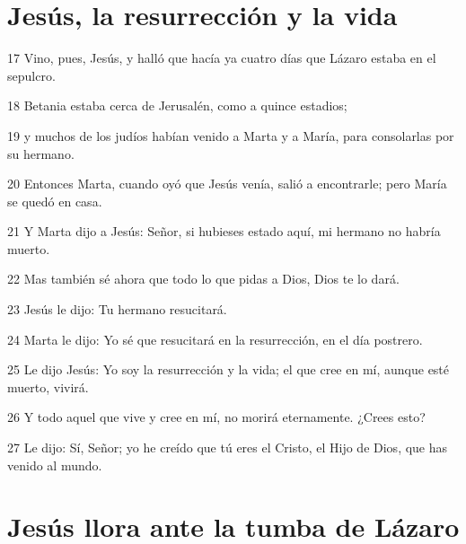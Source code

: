 \section*{Jesús, la resurrección y la vida}

\par 17 Vino, pues, Jesús, y halló que hacía ya cuatro días que Lázaro estaba en el sepulcro.
\par 18 Betania estaba cerca de Jerusalén, como a quince estadios;
\par 19 y muchos de los judíos habían venido a Marta y a María, para consolarlas por su hermano.
\par 20 Entonces Marta, cuando oyó que Jesús venía, salió a encontrarle; pero María se quedó en casa.
\par 21 Y Marta dijo a Jesús: Señor, si hubieses estado aquí, mi hermano no habría muerto.
\par 22 Mas también sé ahora que todo lo que pidas a Dios, Dios te lo dará.
\par 23 Jesús le dijo: Tu hermano resucitará.
\par 24 Marta le dijo: Yo sé que resucitará en la resurrección, en el día postrero.
\par 25 Le dijo Jesús: Yo soy la resurrección y la vida; el que cree en mí, aunque esté muerto, vivirá.
\par 26 Y todo aquel que vive y cree en mí, no morirá eternamente. ¿Crees esto?
\par 27 Le dijo: Sí, Señor; yo he creído que tú eres el Cristo, el Hijo de Dios, que has venido al mundo.

\section*{Jesús llora ante la tumba de Lázaro}

